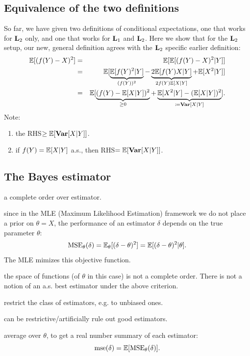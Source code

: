 \documentclass{article}
\begin{document}
\subsection{Equivalence of the two definitions}

So far, we have given two definitions of conditional expectations, one that works for $\mathbf L_2$ only, and one that works for $\mathbf L_1$ and $\mathbf L_2$. Here we show that for the $\mathbf L_2$ setup, our new, general definition agrees with the $\mathbf L_2$ specific earlier definition:
\begin{eqnarray*}
{\mathbb E}[ (f(Y) - X)^2 ] &=& {\mathbb E}[ {\mathbb E}[ (f(Y) - X)^2 | Y ]] \\
&=& {\mathbb E} [ \underbrace{ {\mathbb E}[ f(Y)^2 | Y ]}_{(f(Y))^2} - \underbrace{ 2 {\mathbb E}[ f(Y) X | Y] }_{2 f(Y) {\mathbb E}[X|Y]} + {\mathbb E}[ X^2 | Y] ] \\
&=& {\mathbb E}[ \underbrace{(f(Y) - {\mathbb E}[X|Y])^2}_{\ge 0} + \underbrace{ {\mathbb E}[X^2 | Y] - ({\mathbb E}[X|Y])^2 }_{\coloneqq {\text {\bf Var}}[X|Y]} ].
\end{eqnarray*}
Note:
\begin{enumerate}
  \item the RHS$\ge {\mathbb E}[ {\text {\bf Var}}[X|Y]]$.
  \item if $f(Y) = {\mathbb E}[X|Y]$ a.s., then RHS$={\mathbb E}[{\text {\bf Var}}[X|Y]]$.
\end{enumerate}


\subsection{The Bayes estimator}

 a complete order over estimator.

 since in the MLE (Maximum Likelihood Estimation) framework we do not place a prior on $\theta = X$, the performance of an estimator $\delta$ depends on the true parameter $\theta$:
\[ \text{MSE}_\theta(\delta) = {\mathbb E}_\theta[(\delta - \theta)^2] = {\mathbb E}[(\delta - \theta)^2 | \theta]. \]
The MLE mimizes this objective function.

 the space of functions (of $\theta$ in this case) is not a complete order. There is not a notion of an a.s. best estimator under the above criterion.

 restrict the class of estimators, e.g. to unbiased ones.

 can be restrictive/artificially rule out good estimators. 

 average over $\theta$, to get a real number summary of each estimator:
\[ \text{mse}(\delta) = {\mathbb E}[ \text{MSE}_\theta(\delta) ]. \]
\end{document}
